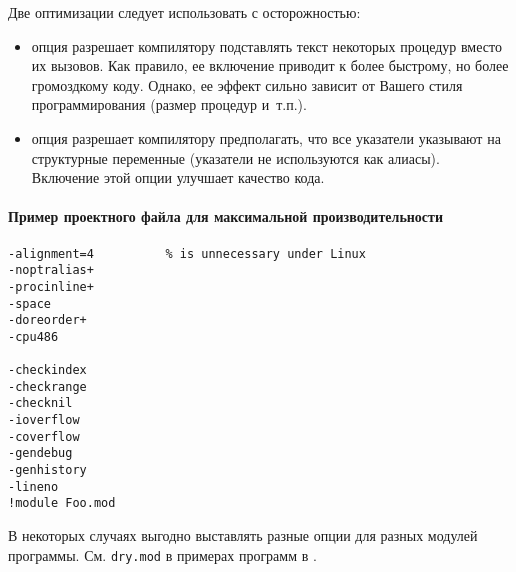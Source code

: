 Две оптимизации следует использовать с осторожностью:
\begin{itemize}
\item опция  разрешает компилятору подставлять 
      текст некоторых процедур вместо их вызовов. Как правило, ее
      включение приводит к более быстрому, но более громоздкому коду.
      Однако, ее эффект сильно зависит от Вашего стиля программирования
      (размер процедур и~т.п.).
\item опция  разрешает компилятору предполагать,
      что все указатели указывают на структурные переменные
      (указатели не используются как алиасы). Включение этой опции
      улучшает качество кода.
\end{itemize}

\paragraph{Пример проектного файла для максимальной производительности}
\begin{verbatim}
-alignment=4          % is unnecessary under Linux
-noptralias+
-procinline+
-space
-doreorder+
-cpu486

-checkindex
-checkrange
-checknil
-ioverflow
-coverflow
-gendebug
-genhistory
-lineno
!module Foo.mod
\end{verbatim}
В некоторых случаях выгодно выставлять разные опции для разных
модулей программы. См. {\tt dry.mod} в примерах программ в \XDS{}.

\fi %
